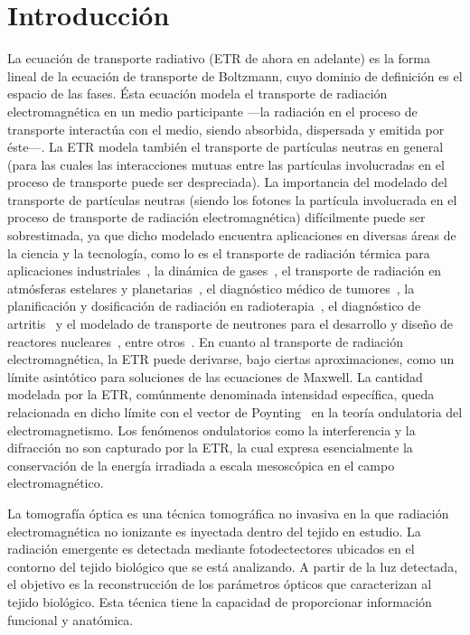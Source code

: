 \chapter{Introducción}
\lhead{\thepage}
\vspace{0.01\textheight}

La ecuación de transporte radiativo (ETR de ahora en adelante) es la forma lineal de la ecuación de transporte de Boltzmann, 
cuyo dominio de definición es el espacio de las fases. Ésta ecuación modela el transporte 
de radiación electromagnética en un medio participante ---la radiación en el proceso de transporte 
interactúa con el medio, siendo absorbida, dispersada y emitida por éste---. La ETR modela también el transporte de partículas neutras en
 general (para las cuales las interacciones mutuas entre las partículas involucradas 
 en el proceso de transporte puede ser despreciada). La importancia del modelado del transporte de 
 partículas neutras (siendo los fotones la partícula involucrada en el proceso de transporte de 
 radiación electromagnética) difícilmente puede ser sobrestimada, ya que dicho modelado encuentra aplicaciones en diversas
 áreas de la ciencia y la tecnología, como lo es el transporte de radiación 
 térmica para aplicaciones industriales~\cite{Howell2010, Thynell1998}, la dinámica de 
 gases~\cite{Duderstadt1979}, el transporte de radiación en atmósferas estelares y 
 planetarias~\cite{Qin2015, Dymond1997, Chandrasekhar1960}, el diagnóstico médico de 
 tumores~\cite{Zhu2005, Zhu2010, Fujii2016b}, la planificación y dosificación 
 de radiación en radioterapia~\cite{Vassiliev2010,Bedford2019}, el diagnóstico de artritis~\cite{Klose2002, Netz2001} 
 y el modelado de transporte de neutrones para el desarrollo 
 y diseño de reactores nucleares~\cite{Larsen2006, Sanchez1982, Anli2006}, entre otros~\cite {Mishchenko1999, Prasher2003}. 
 En cuanto al transporte de radiación electromagnética, la ETR puede derivarse, bajo ciertas aproximaciones, como un límite asintótico 
 para soluciones de las ecuaciones de Maxwell. La cantidad modelada por la ETR, comúnmente denominada 
 intensidad específica, queda relacionada en dicho límite con el vector de Poynting~\cite{Mishchenko2002, Ripoll2011} 
 en la teoría ondulatoria del electromagnetismo. Los fenómenos ondulatorios como la interferencia y la difracción no son
 capturado por la ETR, la cual expresa esencialmente la conservación de la
 energía irradiada a escala mesoscópica en el campo electromagnético.

 La tomografía óptica es una técnica tomográfica no invasiva en la que
 radiación electromagnética no ionizante es inyectada dentro del tejido en estudio.
 La radiación emergente es detectada mediante fotodectectores 
 ubicados en el contorno del tejido biológico que se está analizando. A
  partir de la luz detectada, el objetivo es la reconstrucción de
 los parámetros ópticos que caracterizan al tejido biológico. Esta técnica 
 tiene la capacidad de proporcionar información funcional y anatómica. 
 
